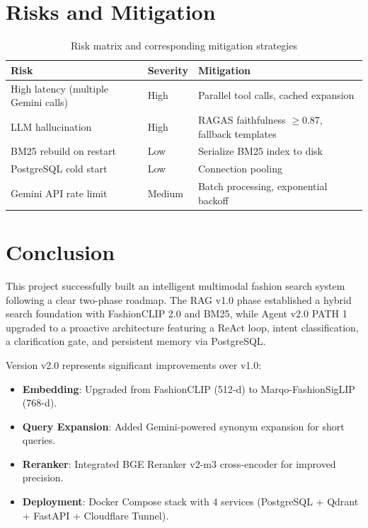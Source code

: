 \section{Risks and Mitigation}

\begin{table}[H]
\centering
\begin{tabular}{lll}
\toprule
\textbf{Risk} & \textbf{Severity} & \textbf{Mitigation}\\
\midrule
High latency (multiple Gemini calls) & High   & Parallel tool calls, cached expansion\\
LLM hallucination                    & High   & RAGAS faithfulness $\geq$0.87, fallback templates\\
BM25 rebuild on restart              & Low    & Serialize BM25 index to disk\\
PostgreSQL cold start                & Low    & Connection pooling\\
Gemini API rate limit                & Medium & Batch processing, exponential backoff\\
\bottomrule
\end{tabular}
\caption{Risk matrix and corresponding mitigation strategies}
\end{table}

\section{Conclusion}
This project successfully built an intelligent multimodal fashion search system following a clear two-phase roadmap. The RAG v1.0 phase established a hybrid search foundation with FashionCLIP 2.0 and BM25, while Agent v2.0 PATH 1 upgraded to a proactive architecture featuring a ReAct loop, intent classification, a clarification gate, and persistent memory via PostgreSQL.

Version v2.0 represents significant improvements over v1.0:
\begin{itemize}
    \item \textbf{Embedding}: Upgraded from FashionCLIP (512-d) to Marqo-FashionSigLIP (768-d).
    \item \textbf{Query Expansion}: Added Gemini-powered synonym expansion for short queries.
    \item \textbf{Reranker}: Integrated BGE Reranker v2-m3 cross-encoder for improved precision.
    \item \textbf{Deployment}: Docker Compose stack with 4 services (PostgreSQL + Qdrant + FastAPI + Cloudflare Tunnel).
\end{itemize}


